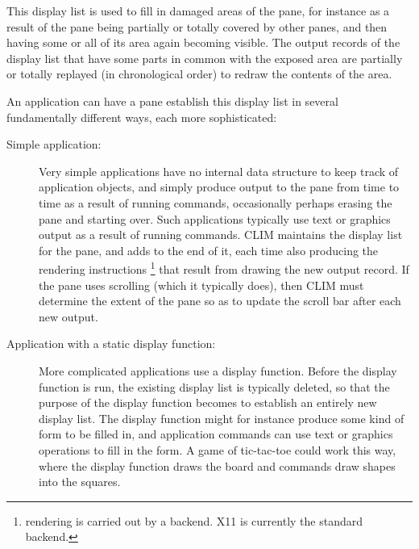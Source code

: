 This display list is used to fill in damaged areas of the pane, for
instance as a result of the pane being partially or totally covered by
other panes, and then having some or all of its area again becoming
visible.  The output records of the display list that have some parts
in common with the exposed area are partially or totally replayed (in
chronological order) to redraw the contents of the area.

An application can have a pane establish this display list in several
fundamentally different ways, each more sophisticated:

\begin{description}
  \item[Simple application:] Very simple applications have no internal
    data structure to keep track of application objects, and simply
    produce output to the pane from time to time as a result of
    running commands, occasionally perhaps erasing the pane and
    starting over.  Such applications typically use text or graphics
    output as a result of running commands.  CLIM maintains the
    display list for the pane, and adds to the end of it, each time
    also producing the rendering instructions \footnote{rendering is
      carried out by a backend. X11 is currently the standard
      backend.} that result from drawing the new output record.  If
    the pane uses scrolling (which it typically does), then CLIM must
    determine the extent of the pane so as to update the scroll bar
    after each new output.

  \item[Application with a static display function:] More complicated
    applications use a display function.  Before the display function
    is run, the existing display list is typically deleted, so that
    the purpose of the display function becomes to establish an
    entirely new display list.  The display function might for
    instance produce some kind of form to be filled in, and
    application commands can use text or graphics operations to fill
    in the form.  A game of tic-tac-toe could work this way, where the
    display function draws the board and commands draw shapes into the
    squares.


\end{description}
